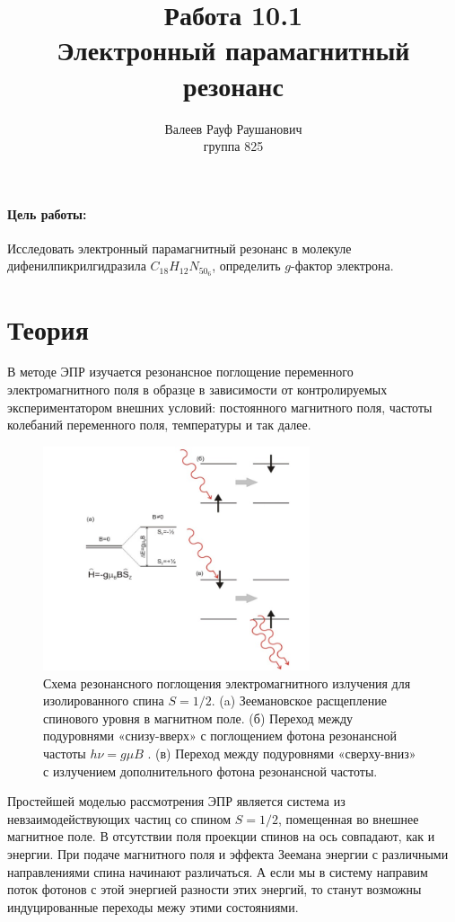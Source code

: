 \documentclass[a4paper, 12pt]{article}%
\author{Валеев Рауф Раушанович \\
группа 825}
\title{\textbf{Работа 10.1\\
Электронный парамагнитный резонанс}}
\begin{document}
\maketitle
\newpage
\paragraph*{Цель работы:} Исследовать электронный парамагнитный резонанс в молекуле дифенилпикрилгидразила $C_{18}H_{12}N_50_6$, определить $g$-фактор электрона. 
\section*{Теория}
В методе ЭПР изучается резонансное поглощение переменного электромагнитного поля в образце в зависимости от контролируемых экспериментатором внешних условий: постоянного магнитного поля, частоты колебаний переменного поля, температуры и так далее.
 
\begin{figure}[h]
\begin{center}
\includegraphics[width = 0.7\textwidth]{1.jpg}
\caption{Схема резонансного поглощения электромагнитного излучения для изолированного спина $S=1/2$. (a) Зеемановское расщепление спинового уровня в магнитном поле. (б) Переход между подуровнями «снизу-вверх» с поглощением фотона резонансной частоты $h\nu=g\mu B$  . (в) Переход между подуровнями «сверху-вниз» с излучением дополнительного фотона резонансной частоты.}
\end{center}
\end{figure}

Простейшей моделью рассмотрения ЭПР является система из невзаимодействующих частиц со спином $S = 1/2$, помещенная во внешнее магнитное поле. В отсутствии поля проекции спинов на ось совпадают, как и энергии. При подаче магнитного поля и эффекта Зеемана энергии с различными направлениями спина начинают различаться. А если мы в систему направим поток фотонов с этой энергией разности этих энергий, то станут возможны индуцированные переходы межу этими состояниями. 
\end{document}

